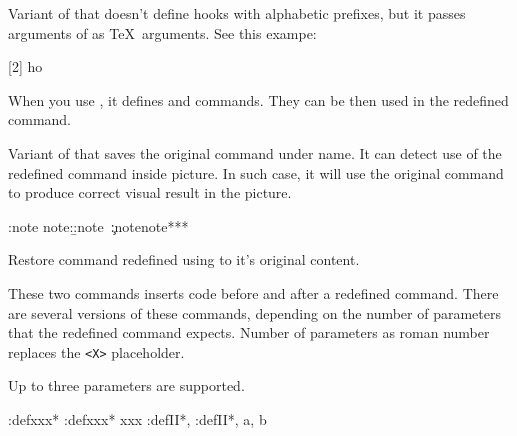 Variant of  that doesn't define hooks with 
alphabetic prefixes, but it passes arguments of 
as \TeX\ arguments. See this exampe:

\begin{texsource}
[2]{\def\hookI{#1}\def\hookII{#2}}
\def\try#1{\hookI#1\hookII}
\try{ho} 
\end{texsource}

When you use , it defines  and 
commands. They can be then used in the redefined  command.


Variant of  that saves the original command under  name.
It can detect use of the redefined command inside picture. In such case, it will use
the original command to produce correct visual result in the picture.

\begin{texsource}
\def\:tempa#1{\a:note note:\b:note~#1\c:note}
\HLet\note\:tempa
\Configure{note}{*}{*}{*}
\end{texsource}


Restore command redefined using  to it's original content.



These two commands inserts code before and after a redefined command. There are several
versions of these commands, depending on the number of parameters that the redefined 
command expects. Number of parameters as roman number replaces the \verb|<X>| placeholder. 

Up to three parameters are supported.


\begin{texsource}
\newcommand\bar{xxx}
\pend:def\bar{*}
\append:def\bar{*}
\bar
\newcommand\foo[2]{#1, #2}
\pend:defII\foo{*}
\append:defII\foo{*}
\foo{a}{b}

\end{texsource}


